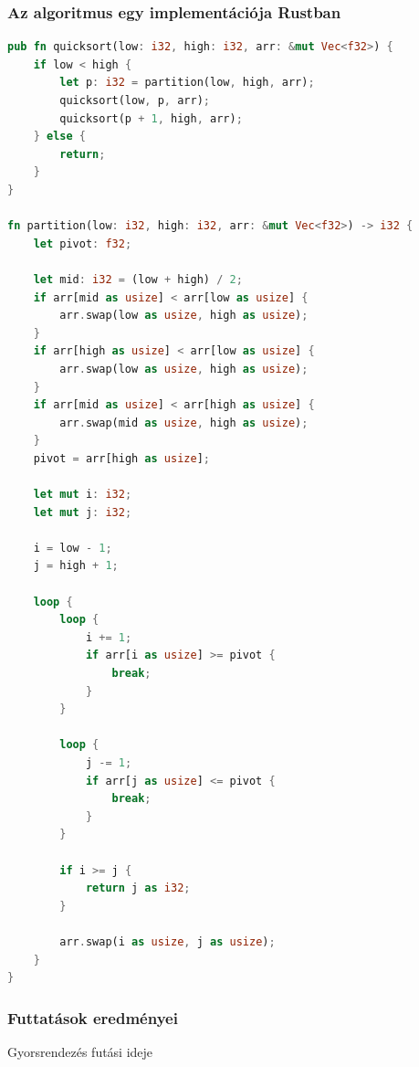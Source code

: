 \subsubsection{Az algoritmus egy implementációja Rustban}
\begin{lstlisting}[language=Rust]
pub fn quicksort(low: i32, high: i32, arr: &mut Vec<f32>) {
    if low < high {
        let p: i32 = partition(low, high, arr);
        quicksort(low, p, arr);
        quicksort(p + 1, high, arr);
    } else {
        return;
    }
}

fn partition(low: i32, high: i32, arr: &mut Vec<f32>) -> i32 {
    let pivot: f32;

    let mid: i32 = (low + high) / 2;
    if arr[mid as usize] < arr[low as usize] {
        arr.swap(low as usize, high as usize);
    }
    if arr[high as usize] < arr[low as usize] {
        arr.swap(low as usize, high as usize);
    }
    if arr[mid as usize] < arr[high as usize] {
        arr.swap(mid as usize, high as usize);
    }
    pivot = arr[high as usize];

    let mut i: i32;
    let mut j: i32;

    i = low - 1;
    j = high + 1;

    loop {
        loop {
            i += 1;
            if arr[i as usize] >= pivot {
                break;
            }
        }

        loop {
            j -= 1;
            if arr[j as usize] <= pivot {
                break;
            }
        }

        if i >= j {
            return j as i32;
        }

        arr.swap(i as usize, j as usize);
    }
}

\end{lstlisting}
\subsubsection{Futtatások eredményei}
Gyorsrendezés futási ideje

